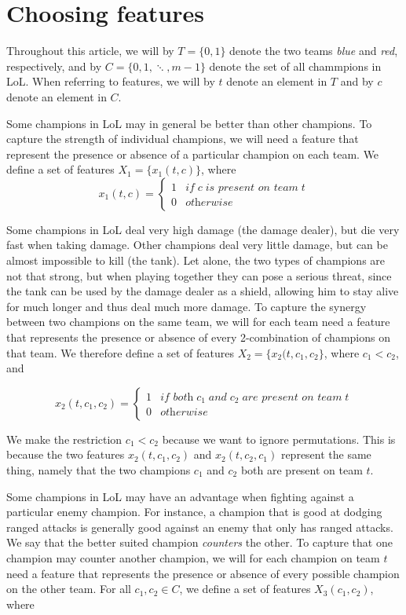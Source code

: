 \section{Choosing features}\label{sec:choosingfeatures}
Throughout this article, we will by $T = \{0, 1\}$ denote the two teams \textit{blue} and \textit{red}, respectively, and by $C = \{0, 1, \ddots, m-1\}$ denote the set of all chammpions in LoL. When referring to features, we will by $t$ denote an element in $T$ and by $c$ denote an element in $C$.

Some champions in LoL may in general be better than other champions.
To capture the strength of individual champions, we will need a feature that represent the presence or absence of a particular champion on each team.
We define a set of features $X_1 = \{x_1(t, c)\}$, where
\[x_1(t, c) = \begin{cases} 1 & \textit{if} \; c \; \textit{is present on team} \; t \\
						    0 & \textit{otherwise} \end{cases}\]

Some champions in LoL deal very high damage (the damage dealer), but die very fast when taking damage. Other champions deal very little damage, but can be almost impossible to kill (the tank). Let alone, the two types of champions are not that strong, but when playing together they can pose a serious threat, since the tank can be used by the damage dealer as a shield, allowing him to stay alive for much longer and thus deal much more damage.
To capture the synergy between two champions on the same team, we will for each team need a feature that represents the presence or absence of every 2-combination of champions on that team. We therefore define a set of features $X_2 = \{x_2(t, c_1, c_2\}$, where $c_1 < c_2$, and

\[
x_2(t, c_1, c_2) = \begin{cases} 1 & \textit{if both} \; c_1 \; \textit{and} \; c_2 \; \textit{are present on team} \; t \\
                                 0 & \textit{otherwise} \end{cases}
\]

We make the restriction $c_1 < c_2$ because we want to ignore permutations. This is because the two features $x_2(t, c_1, c_2)$ and $x_2(t, c_2, c_1)$ represent the same thing, namely that the two champions $c_1$ and $c_2$ both are present on team $t$.

Some champions in LoL may have an advantage when fighting against a particular enemy champion.
For instance, a champion that is good at dodging ranged attacks is generally good against an enemy that only has ranged attacks.
We say that the better suited champion \textit{counters} the other.
To capture that one champion may counter another champion, we will for each champion on team $t$ need a feature that represents the presence or absence of every possible champion on the other team.
For all $c_1, c_2 \in C$, we define a set of features $X_3(c_1, c_2)$, where

